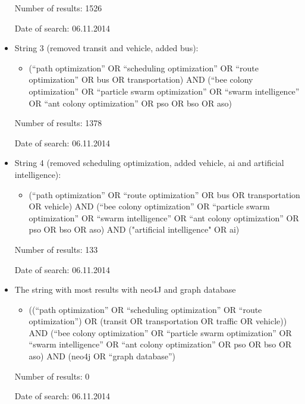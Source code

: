 \begin{itemize}
\par Number of results: 1526
\par Date of search: 06.11.2014
\item String 3 (removed transit and vehicle, added bus):
\begin{itemize}
\item(``path optimization'' OR ``scheduling optimization'' OR ``route optimization'' OR bus OR transportation) AND (``bee colony optimization'' OR ``particle swarm optimization'' OR ``swarm intelligence'' OR ``ant colony optimization'' OR pso OR bso OR aso)
\end{itemize}
\par Number of results: 1378
\par Date of search: 06.11.2014
\item String 4 (removed scheduling optimization, added vehicle, ai and artificial intelligence):
\begin{itemize}
\item(``path optimization''  OR ``route optimization'' OR bus OR transportation OR vehicle) AND (``bee colony optimization'' OR ``particle swarm optimization'' OR ``swarm intelligence'' OR ``ant colony optimization'' OR pso OR bso OR aso)  AND ("artificial intelligence" OR ai) 
\end{itemize}
\par Number of results: 133
\par Date of search: 06.11.2014
\item The string with most results with neo4J and graph database
\begin{itemize}
\item((``path optimization'' OR ``scheduling optimization'' OR ``route optimization'') OR (transit OR transportation OR traffic OR vehicle)) AND (``bee colony optimization'' OR ``particle swarm optimization'' OR ``swarm intelligence'' OR ``ant colony optimization'' OR pso OR bso OR aso) AND (neo4j OR ``graph database'')
\end{itemize}
\par Number of results: 0
\par Date of search: 06.11.2014
\end{itemize}

